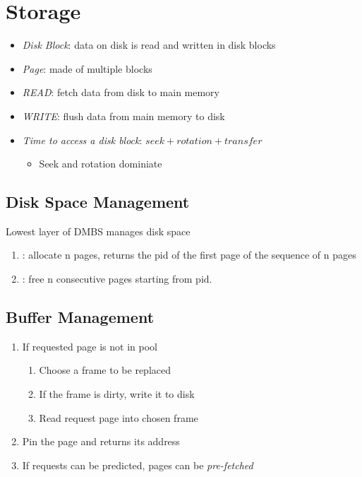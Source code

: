 \chapter{Storage}

\begin{itemize}
  \item \emph{Disk Block}: data on disk is read and written in disk blocks
  \item \emph{Page}: made of multiple blocks
  \item \emph{READ}: fetch data from disk to main memory
  \item \emph{WRITE}: flush data from main memory to disk
  \item \emph{Time to access a disk block}: $ seek + rotation + transfer $
  \begin{itemize}
    \item Seek and rotation dominiate
  \end{itemize}
\end{itemize}

\section{Disk Space Management}

  Lowest layer of DMBS manages disk space

  \begin{enumerate}
    \item {}: allocate n pages, returns the pid of the
    first page of the sequence of n pages
    \item {}: free n consecutive pages starting
    from pid.
  \end{enumerate}

\section{Buffer Management}

  \begin{enumerate}
    \item If requested page is not in pool
    \begin{enumerate}
      \item Choose a frame to be replaced
      \item If the frame is dirty, write it to disk
      \item Read request page into chosen frame
    \end{enumerate}

    \item Pin the page and returns its address
    \item If requests can be predicted, pages can be \emph{pre-fetched}
  \end{enumerate}


